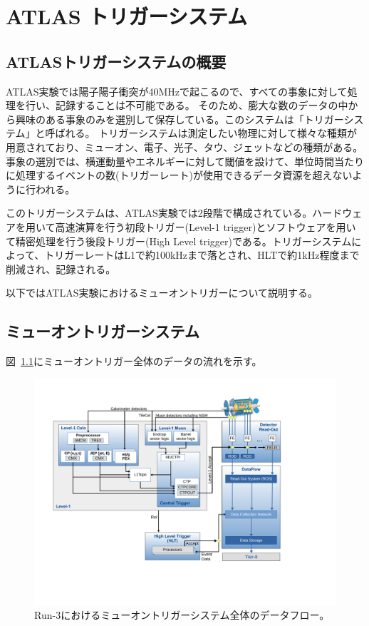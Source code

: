 \chapter{ATLAS トリガーシステム}\label{chapter3}

\section{ATLASトリガーシステムの概要}\label{chapter3-1}
ATLAS実験では陽子陽子衝突が40MHzで起こるので、すべての事象に対して処理を行い、記録することは不可能である。
そのため、膨大な数のデータの中から興味のある事象のみを選別して保存している。このシステムは「トリガーシステム」と呼ばれる。
トリガーシステムは測定したい物理に対して様々な種類が用意されており、ミューオン、電子、光子、タウ、ジェットなどの種類がある。事象の選別では、横運動量やエネルギーに対して閾値を設けて、単位時間当たりに処理するイベントの数(トリガーレート)が使用できるデータ資源を超えないように行われる。

このトリガーシステムは、ATLAS実験では2段階で構成されている。ハードウェアを用いて高速演算を行う初段トリガー(Level-1 trigger)とソフトウェアを用いて精密処理を行う後段トリガー(High Level trigger)である。トリガーシステムによって、トリガーレートはL1で約100kHzまで落とされ、HLTで約1kHz程度まで削減され、記録される。

以下ではATLAS実験におけるミューオントリガーについて説明する。

\section{ミューオントリガーシステム}\label{chapter3-2}
図~\ref{fig:3-1}にミューオントリガー全体のデータの流れを示す。

\begin{figure}[h]
  \centering
  \includegraphics[clip, width=14cm]{fig/3/tdaq-run3-schematic.pdf}
  \caption{Run-3におけるミューオントリガーシステム全体のデータフロー\cite{article:approvedPlotsDAQ}。}
  \label{fig:3-1}
\end{figure}

